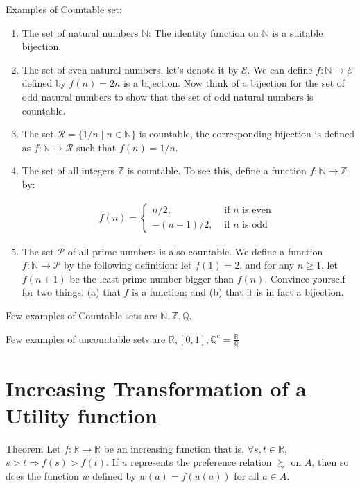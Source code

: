 \documentclass[12pt,a4paper,fleqn]{article}
\begin{document}
  Examples of Countable set:
  \begin{enumerate}
   
    \item The set of natural numbers \(\mathbb{N}\): The identity function on \(\mathbb{N}\) is a suitable bijection.
    \item The set of even natural numbers, let's denote it by \(\mathcal{E}\). We can define \(f: \mathbb{N} \rightarrow \mathcal{E}\) defined by \(f(n)=2 n\) is a bijection. Now think of a bijection for the set of odd natural numbers to show that the set of odd natural numbers is countable.
    \item The set \(\mathcal{R}=\{1 / n \mid n \in \mathbb{N}\} \) is countable, the corresponding bijection is defined as \(f: \mathbb{N} \rightarrow \mathcal{R}\) such that \(f(n)=1 / n\).
    \item The set of all integers \(\mathbb{Z}\) is countable. To see this, define a function \(f: \mathbb{N} \rightarrow \mathbb{Z}\) by:
    
    \begin{align*}
    f(n)= \begin{cases}n / 2, & \text { if } n \text { is even } \\ -(n-1) / 2, & \text { if } n \text { is odd }\end{cases}
    \end{align*}
    
    \item The set \(\mathcal{P}\) of all prime numbers is also countable. We define a function \(f: \mathbb{N} \rightarrow \mathcal{P}\) by the following definition: let \(f(1)=2\), and for any \(n \geq 1\), let \(f(n+1)\) be the least prime number bigger than \(f(n)\). Convince yourself for two things: (a) that \(f\) is a function; and (b) that it is in fact a bijection.
  \end{enumerate}

  Few examples of Countable sets are \(\mathbb{N}, \mathbb{Z}, \mathbb{Q}\).
  
  Few examples of uncountable sets are \(\mathbb{R}, [0,1], \mathbb{Q}^{c}=\frac{\mathbb{R}}{\mathbb{Q}}\)  

   \section{Increasing Transformation of a Utility function} 

   Theorem
Let \(f: \mathbb{R} \rightarrow \mathbb{R}\) be an increasing function that is, \(\forall s, t \in \mathbb{R}\), \(s>t \Rightarrow f(s)>f(t)\). If \(u\) represents the preference relation \(\succsim \) on \(A\), then so does the function \(w\) defined by \(w(a)=f(u(a))\) for all \(a \in A\).
\end{document}

